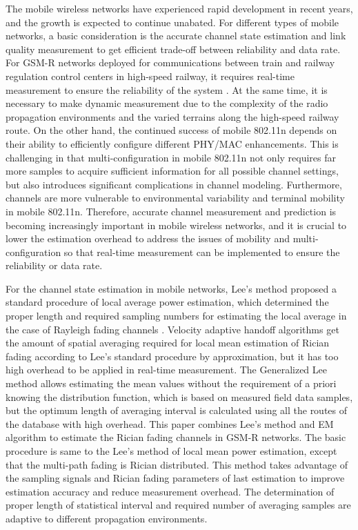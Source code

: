 \begin{englishabstract}

The mobile wireless networks have experienced rapid development in recent years, and the growth is expected to continue unabated. For different types of mobile networks, a basic consideration is the accurate channel state estimation and link quality measurement to get efficient trade-off between reliability and data rate. For GSM-R networks deployed for communications between train and railway regulation control centers in high-speed railway, it requires real-time measurement to ensure the reliability of the system \cite{baldini2010early}. At the same time, it is necessary to make dynamic measurement due to the complexity of the radio propagation environments and the varied terrains along the high-speed railway route. On the other hand, the continued success of mobile 802.11n depends on their ability to efficiently configure different PHY/MAC enhancements. This is challenging in that multi-configuration in mobile 802.11n not only requires far more samples to acquire sufficient information for all possible channel settings, but also introduces significant complications in channel modeling. Furthermore, channels are more vulnerable to environmental variability and terminal mobility in mobile 802.11n. Therefore, accurate channel measurement and prediction is becoming increasingly important in mobile wireless networks, and it is crucial to lower the estimation overhead to address the issues of mobility and multi-configuration so that real-time measurement can be implemented to ensure the reliability or data rate.

For the channel state estimation in mobile networks, Lee's method proposed a standard procedure of local average power estimation, which determined the proper length and required sampling numbers for estimating the local average in the case of Rayleigh fading channels . Velocity adaptive handoff algorithms  get the amount of spatial averaging required for local mean estimation of Rician fading according to Lee's standard procedure by approximation, but it has too high overhead to be applied in real-time measurement. The Generalized Lee method  allows estimating the mean values without the requirement of a priori knowing the distribution function, which is based on measured field data samples, but the optimum length of averaging interval is calculated using all the routes of the database with high overhead. This paper combines Lee's method and EM algorithm to estimate the Rician fading channels in GSM-R networks. The basic procedure is same to the Lee's method of local mean power estimation, except that the multi-path fading is Rician distributed. This method takes advantage of the sampling signals and Rician fading parameters of last estimation to improve estimation accuracy and reduce measurement overhead. The determination of proper length of statistical interval and required number of averaging samples are adaptive to different propagation environments.


\end{englishabstract}
